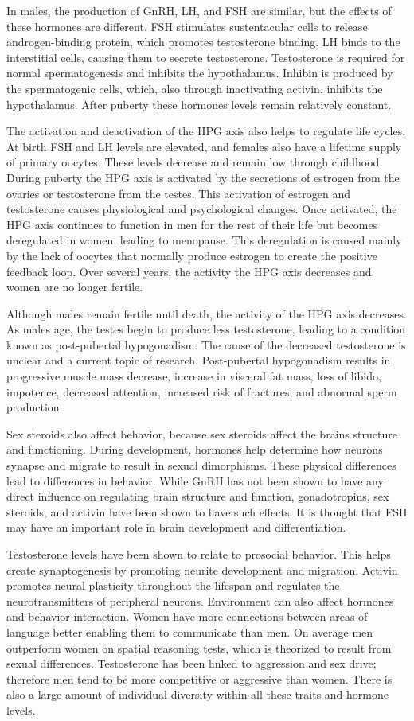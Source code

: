 In males, the production of GnRH, LH, and FSH are similar, but the effects of these hormones are different. FSH stimulates sustentacular cells to release androgen-binding protein, which promotes testosterone binding. LH binds to the interstitial cells, causing them to secrete testosterone. Testosterone is required for normal spermatogenesis and inhibits the hypothalamus. Inhibin is produced by the spermatogenic cells, which, also through inactivating activin, inhibits the hypothalamus. After puberty these hormones levels remain relatively constant.

The activation and deactivation of the HPG axis also helps to regulate life cycles. At birth FSH and LH levels are elevated, and females also have a lifetime supply of primary oocytes. These levels decrease and remain low through childhood. During puberty the HPG axis is activated by the secretions of estrogen from the ovaries or testosterone from the testes. This activation of estrogen and testosterone causes physiological and psychological changes. Once activated, the HPG axis continues to function in men for the rest of their life but becomes deregulated in women, leading to menopause. This deregulation is caused mainly by the lack of oocytes that normally produce estrogen to create the positive feedback loop. Over several years, the activity the HPG axis decreases and women are no longer fertile.

Although males remain fertile until death, the activity of the HPG axis decreases. As males age, the testes begin to produce less testosterone, leading to a condition known as post-pubertal hypogonadism. The cause of the decreased testosterone is unclear and a current topic of research. Post-pubertal hypogonadism results in progressive muscle mass decrease, increase in visceral fat mass, loss of libido, impotence, decreased attention, increased risk of fractures, and abnormal sperm production.

Sex steroids also affect behavior, because sex steroids affect the brains structure and functioning. During development, hormones help determine how neurons synapse and migrate to result in sexual dimorphisms. These physical differences lead to differences in behavior. While GnRH has not been shown to have any direct influence on regulating brain structure and function, gonadotropins, sex steroids, and activin have been shown to have such effects. It is thought that FSH may have an important role in brain development and differentiation.

Testosterone levels have been shown to relate to prosocial behavior. This helps create synaptogenesis by promoting neurite development and migration. Activin promotes neural plasticity throughout the lifespan and regulates the neurotransmitters of peripheral neurons. Environment can also affect hormones and behavior interaction. Women have more connections between areas of language better enabling them to communicate than men. On average men outperform women on spatial reasoning tests, which is theorized to result from sexual differences. Testosterone has been linked to aggression and sex drive; therefore men tend to be more competitive or aggressive than women. There is also a large amount of individual diversity within all these traits and hormone levels.

